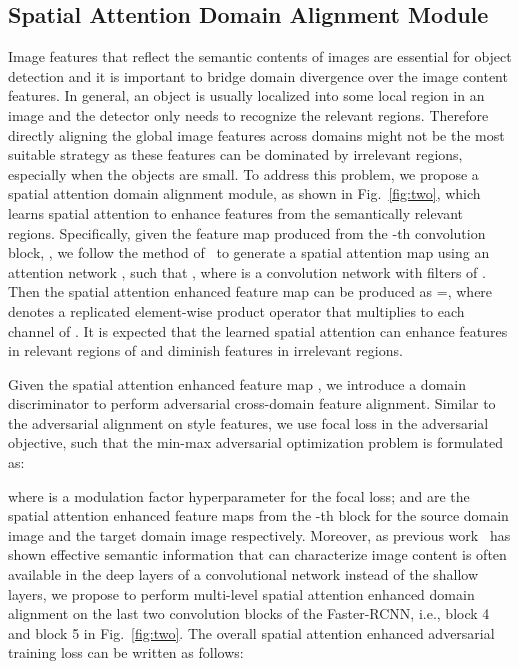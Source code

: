 \documentclass[runningheads]{llncs}
\begin{document}
\subsection{Spatial Attention Domain Alignment Module}

Image features that reflect the semantic contents of images
are essential for object detection and it is important to bridge domain divergence 
over the image content features.
In general, an object is usually localized into some local region in an image
and the detector only needs to recognize the relevant regions.
Therefore directly aligning the global image features across domains might not 
be the most suitable strategy as these features can be dominated by irrelevant regions,
especially when the objects are small.
To address this problem, we propose a spatial attention domain alignment module,
as shown in Fig.~\ref{fig:two},  
which learns spatial attention to enhance features from the semantically relevant regions. 
Specifically, given the feature map produced from the -th convolution block, , 
we follow the method of~\cite{WooCBAM} to generate a spatial attention map  
using an attention network , such that 
, where  is 
a convolution network with filters of .
Then the spatial attention enhanced feature map can be produced as 
=, where  denotes a replicated element-wise product operator 
that multiplies  to each channel of .
It is expected that the learned spatial attention can enhance features in relevant regions of 
and diminish features in irrelevant regions.


Given the spatial attention enhanced feature map , we introduce a domain discriminator 
 to perform adversarial cross-domain feature alignment. 
Similar to the adversarial alignment on style features, we use focal loss in the adversarial objective, 
such that the min-max adversarial optimization problem is formulated as:

where  is a modulation factor hyperparameter for the focal loss;  and  are the spatial attention enhanced feature maps from the -th block 
for the source domain image  and the target domain image  respectively. 
Moreover, 
as previous work~\cite{Gatys2016Image,JohnsonPerceptual} has shown 
effective semantic information that can characterize image content is often available 
in the deep layers of a convolutional network instead of the shallow layers,
we propose to perform multi-level spatial attention enhanced domain alignment
on the last two convolution blocks of the Faster-RCNN, i.e., block 4 and block 5 in Fig.~\ref{fig:two}.  
The overall spatial attention enhanced adversarial training loss  can be written as follows:
\end{document}
